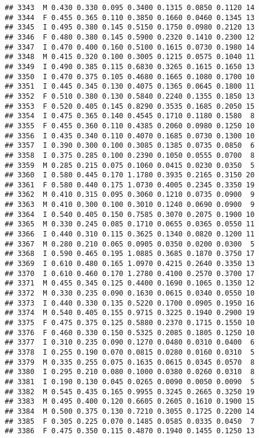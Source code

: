 \documentclass[
]{article}
\begin{document}
\begin{verbatim}
## 3343  M 0.430 0.330 0.095 0.3400 0.1315 0.0850 0.1120 14
## 3344  F 0.455 0.365 0.110 0.3850 0.1660 0.0460 0.1345 13
## 3345  I 0.495 0.380 0.145 0.5150 0.1750 0.0980 0.2120 13
## 3346  F 0.480 0.380 0.145 0.5900 0.2320 0.1410 0.2300 12
## 3347  I 0.470 0.400 0.160 0.5100 0.1615 0.0730 0.1980 14
## 3348  M 0.415 0.320 0.100 0.3005 0.1215 0.0575 0.1040 11
## 3349  I 0.490 0.385 0.115 0.6830 0.3265 0.1615 0.1650 13
## 3350  I 0.470 0.375 0.105 0.4680 0.1665 0.1080 0.1700 10
## 3351  I 0.445 0.345 0.130 0.4075 0.1365 0.0645 0.1800 11
## 3352  F 0.510 0.380 0.130 0.5840 0.2240 0.1355 0.1850 13
## 3353  F 0.520 0.405 0.145 0.8290 0.3535 0.1685 0.2050 15
## 3354  I 0.475 0.365 0.140 0.4545 0.1710 0.1180 0.1580  8
## 3355  F 0.455 0.360 0.110 0.4385 0.2060 0.0980 0.1250 10
## 3356  I 0.435 0.340 0.110 0.4070 0.1685 0.0730 0.1300 10
## 3357  I 0.390 0.300 0.100 0.3085 0.1385 0.0735 0.0850  6
## 3358  I 0.375 0.285 0.100 0.2390 0.1050 0.0555 0.0700  8
## 3359  M 0.285 0.215 0.075 0.1060 0.0415 0.0230 0.0350  5
## 3360  I 0.580 0.445 0.170 1.1780 0.3935 0.2165 0.3150 20
## 3361  F 0.580 0.440 0.175 1.0730 0.4005 0.2345 0.3350 19
## 3362  M 0.410 0.315 0.095 0.3060 0.1210 0.0735 0.0900  9
## 3363  M 0.410 0.300 0.100 0.3010 0.1240 0.0690 0.0900  9
## 3364  I 0.540 0.405 0.150 0.7585 0.3070 0.2075 0.1900 10
## 3365  M 0.330 0.245 0.085 0.1710 0.0655 0.0365 0.0550 11
## 3366  I 0.440 0.310 0.115 0.3625 0.1340 0.0820 0.1200 11
## 3367  M 0.280 0.210 0.065 0.0905 0.0350 0.0200 0.0300  5
## 3368  I 0.590 0.465 0.195 1.0885 0.3685 0.1870 0.3750 17
## 3369  I 0.610 0.480 0.165 1.0970 0.4215 0.2640 0.3350 13
## 3370  I 0.610 0.460 0.170 1.2780 0.4100 0.2570 0.3700 17
## 3371  M 0.455 0.345 0.125 0.4400 0.1690 0.1065 0.1350 12
## 3372  M 0.330 0.235 0.090 0.1630 0.0615 0.0340 0.0550 10
## 3373  I 0.440 0.330 0.135 0.5220 0.1700 0.0905 0.1950 16
## 3374  M 0.540 0.405 0.155 0.9715 0.3225 0.1940 0.2900 19
## 3375  F 0.475 0.375 0.125 0.5880 0.2370 0.1715 0.1550 10
## 3376  F 0.460 0.330 0.150 0.5325 0.2085 0.1805 0.1250 10
## 3377  I 0.310 0.235 0.090 0.1270 0.0480 0.0310 0.0400  6
## 3378  I 0.255 0.190 0.070 0.0815 0.0280 0.0160 0.0310  5
## 3379  M 0.335 0.255 0.075 0.1635 0.0615 0.0345 0.0570  8
## 3380  I 0.295 0.210 0.080 0.1000 0.0380 0.0260 0.0310  8
## 3381  I 0.190 0.130 0.045 0.0265 0.0090 0.0050 0.0090  5
## 3382  M 0.545 0.435 0.165 0.9955 0.3245 0.2665 0.3250 19
## 3383  M 0.495 0.400 0.120 0.6605 0.2605 0.1610 0.1900 15
## 3384  M 0.500 0.375 0.130 0.7210 0.3055 0.1725 0.2200 14
## 3385  F 0.305 0.225 0.070 0.1485 0.0585 0.0335 0.0450  7
## 3386  F 0.475 0.350 0.115 0.4870 0.1940 0.1455 0.1250 13

\end{verbatim}
\end{document}
